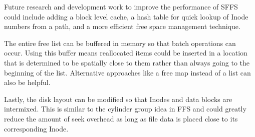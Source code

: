 \documentclass[10pt,twocolumn]{article}
\begin{document}
Future research and development work to improve the performance of SFFS could
include adding a block level cache, a hash table for quick lookup of Inode
numbers from a path, and a more efficient free space management technique.

The entire free list can be buffered in memory so that batch operations can 
occur. Using this buffer means reallocated items could be inserted in a 
location that is determined to be spatially close to them rather than always 
going to the beginning of the list. Alternative approaches like a free map 
instead of a list can also be helpful.

Lastly, the disk layout can be modified so that Inodes and data blocks are
intermixed. This is similar to the cylinder group idea in FFS and could greatly
reduce the amount of seek overhead as long as file data is placed close to its
corresponding Inode.
\end{document}
